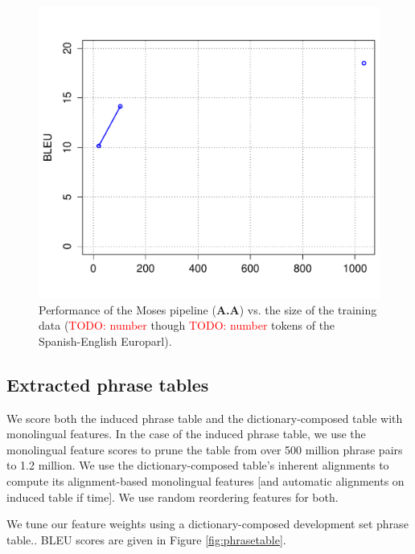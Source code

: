 \documentclass[11pt]{article}
\newcommand{\mnote}[1]{\marginpar{%
  \vskip-\baselineskip
  \raggedright\footnotesize
  \itshape\hrule\smallskip\tiny{#1}\par\smallskip\hrule}}
\newcommand{\mtodo}[1]{\mnote{\textcolor{red}{#1}}}
\newcommand{\todo}[1]{\textcolor{red}{TODO: #1}}
\begin{document}
\begin{figure}[h]
\begin{center}
\includegraphics[width=\linewidth]{../figures/learning/learning.pdf}
\caption{Performance of the Moses pipeline ({\bf A.A}) vs. the size of the training data (\todo{number} though \todo{number} tokens of the Spanish-English Europarl).}
\label{fig:learning}
\end{center}
\vskip -0.2in
\end{figure}

\subsection{Extracted phrase tables}
We score both the induced phrase table and the dictionary-composed table with monolingual features. In the case of the induced phrase table, we use the monolingual feature scores to prune the table from over 500 million phrase pairs to 1.2 million\mtodo{get final number}. We use the dictionary-composed table's inherent alignments to compute its alignment-based monolingual features [and automatic alignments on induced table if time]. We use random reordering features for both. 

We tune our feature weights using a dictionary-composed development set phrase table.\mtodo{Hopefully we show that those weights aren't much different from any other set of weights? Justify just using those for the induced table decode}. BLEU scores are given in Figure \ref{fig:phrasetable}.
\end{document}
